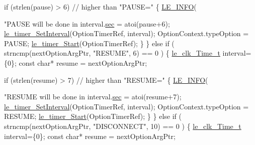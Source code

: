 \begin{DoxyCodeInclude}
{{{{{{{{{{{{            \textcolor{keywordflow}{if} (strlen(pause) > 6) \textcolor{comment}{// higher than "PAUSE="}
            \{
                \hyperlink{le__log_8h_a23e6d206faa64f612045d688cdde5808}{LE\_INFO}(\textcolor{stringliteral}{"PAUSE will be done in %
                interval.\hyperlink{structle__clk___time__t_ae28e527dbd551b3537edc1737611782f}{sec} = atoi(pause+6);
                \hyperlink{le__timer_8h_a0a103d5cef5e83fc9088859d527bbd43}{le\_timer\_SetInterval}(OptionTimerRef, interval);
                OptionContext.typeOption = PAUSE;
                \hyperlink{watchdog_8c_a8f0ef9d6af3090467f5a969c799ad25d}{le\_timer\_Start}(OptionTimerRef);
            \}
        \}
        \textcolor{keywordflow}{else} \textcolor{keywordflow}{if} ( strncmp(nextOptionArgPtr, \textcolor{stringliteral}{"RESUME"}, 6) == 0 )
        \{
            \hyperlink{structle__clk___time__t}{le\_clk\_Time\_t} interval=\{0\};
            \textcolor{keyword}{const} \textcolor{keywordtype}{char}* resume = nextOptionArgPtr;

            \textcolor{keywordflow}{if} (strlen(resume) > 7) \textcolor{comment}{// higher than "RESUME="}
            \{
                \hyperlink{le__log_8h_a23e6d206faa64f612045d688cdde5808}{LE\_INFO}(\textcolor{stringliteral}{"RESUME will be done in %
                interval.\hyperlink{structle__clk___time__t_ae28e527dbd551b3537edc1737611782f}{sec} = atoi(resume+7);
                \hyperlink{le__timer_8h_a0a103d5cef5e83fc9088859d527bbd43}{le\_timer\_SetInterval}(OptionTimerRef, interval);
                OptionContext.typeOption = RESUME;
                \hyperlink{watchdog_8c_a8f0ef9d6af3090467f5a969c799ad25d}{le\_timer\_Start}(OptionTimerRef);
            \}
        \}
        \textcolor{keywordflow}{else} \textcolor{keywordflow}{if} ( strncmp(nextOptionArgPtr, \textcolor{stringliteral}{"DISCONNECT"}, 10) == 0 )
        \{
            \hyperlink{structle__clk___time__t}{le\_clk\_Time\_t} interval=\{0\};
            \textcolor{keyword}{const} \textcolor{keywordtype}{char}* resume = nextOptionArgPtr;

}}}}}}}}}}}}}}
\end{DoxyCodeInclude}
